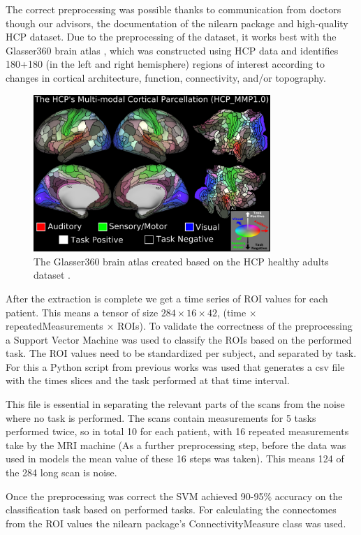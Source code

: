 	The correct preprocessing was possible thanks to communication from doctors though our advisors, the documentation of the nilearn package and high-quality HCP dataset. Due to the preprocessing of the dataset, it works best with the Glasser360 brain atlas \cite{sporns2005human}, which was constructed using HCP data and identifies 180+180 (in the left and right hemisphere) regions of interest according to changes in cortical architecture, function, connectivity, and/or topography.

	\begin{figure}[!h]
		\centering
		\includegraphics[width=0.8\textwidth]{figures/atlas.png}
		\caption{The Glasser360 brain atlas created based on the HCP healthy adults dataset \cite{sporns2005human}.}
	\end{figure}

	After the extraction is complete we get a time series of ROI values for each patient. This means a tensor of size $284 \times 16 \times 42$, (time $\times$ repeatedMeasurements $\times$ ROIs). To validate the correctness of the preprocessing a Support Vector Machine was used to classify the ROIs based on the performed task. The ROI values need to be standardized per subject, and separated by task. For this a Python script from previous works was used that generates a csv file with the times slices and the task performed at that time interval. 
	
	This file is essential in separating the relevant parts of the scans from the noise where no task is performed. The scans contain measurements for 5 tasks performed twice, so in total 10 for	each patient, with 16 repeated measurements take by the MRI machine (As a further preprocessing step, before the data was used in models the mean value of these 16 steps was taken). This means 124 of the 284 long scan is noise.
	
	Once the preprocessing was correct the SVM achieved 90-95\% accuracy on the classification task based on performed tasks. For calculating the connectomes from the ROI values the nilearn package’s ConnectivityMeasure class was used. 
	
